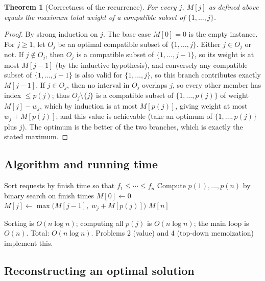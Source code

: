 \documentclass[11pt]{article}
\newtheorem{theorem}{Theorem}[section]
\begin{document}
\begin{theorem}[Correctness of the recurrence]
For every $j$, $M[j]$ as defined above equals the maximum total weight of a compatible
subset of $\{1, \ldots, j\}$.
\end{theorem}

\begin{proof}
By strong induction on $j$. The base case $M[0]=0$ is the empty instance. For $j \ge 1$,
let $O_j$ be an optimal compatible subset of $\{1,\ldots,j\}$. Either $j \in O_j$ or not.
If $j \notin O_j$, then $O_j$ is a compatible subset of $\{1,\ldots,j-1\}$, so its weight
is at most $M[j-1]$ (by the inductive hypothesis), and conversely any compatible subset of
$\{1,\ldots,j-1\}$ is also valid for $\{1,\ldots,j\}$, so this branch contributes exactly
$M[j-1]$. If $j \in O_j$, then no interval in $O_j$ overlaps $j$, so every other member has
index $\le p(j)$; thus $O_j \setminus \{j\}$ is a compatible subset of $\{1,\ldots,p(j)\}$
of weight $M[j] - w_j$, which by induction is at most $M[p(j)]$, giving weight at most
$w_j + M[p(j)]$; and this value is achievable (take an optimum of $\{1,\ldots,p(j)\}$ plus
$j$). The optimum is the better of the two branches, which is exactly the stated maximum.
\end{proof}

\subsection{Algorithm and running time}

\begin{algorithm}[h]
\caption{Weighted-Interval-Scheduling (bottom-up)}
\begin{algorithmic}[1]
\State Sort requests by finish time so that $f_1 \le \cdots \le f_n$
\State Compute $p(1), \ldots, p(n)$ by binary search on finish times
\State $M[0] \gets 0$
    \State $M[j] \gets \max\bigl(M[j-1],\; w_j + M[p(j)]\bigr)$
\EndFor
\State \Return $M[n]$
\end{algorithmic}
\end{algorithm}

Sorting is $O(n\log n)$; computing all $p(j)$ is $O(n \log n)$; the main loop is $O(n)$.
Total: $O(n \log n)$. Problems 2 (value) and 4 (top-down memoization) implement this.

\subsection{Reconstructing an optimal solution}
\end{document}

